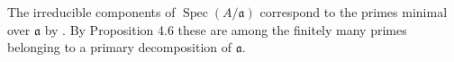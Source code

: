 The irreducible components of $\operatorname{Spec}(A/\mathfrak{a})$ correspond to the primes minimal over $\mathfrak{a}$ by . By Proposition 4.6 these are among the finitely many primes belonging to a primary decomposition of $\mathfrak{a}$.
